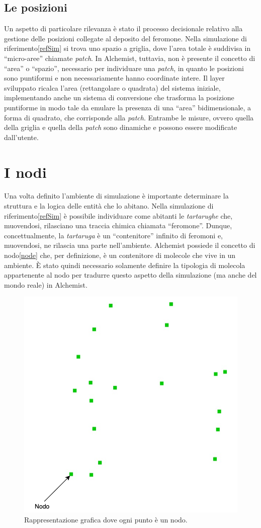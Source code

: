 \subsection{Le posizioni}
Un aspetto di particolare rilevanza è stato il processo decisionale relativo alla gestione delle posizioni collegate 
al deposito del feromone. Nella simulazione di riferimento\space\ref{refSim} si trova uno spazio a griglia, dove l'area totale è suddivisa
in ``micro-aree'' chiamate \textit{patch}. In Alchemist, tuttavia, non è presente il concetto di ``area'' o ``spazio'', necessario per individuare una \textit{patch},
in quanto le posizioni sono puntiformi e non necessariamente hanno coordinate intere. Il layer sviluppato ricalca l'area (rettangolare o quadrata) del sistema iniziale,
implementando anche un sistema di conversione che trasforma la posizione puntiforme in modo tale da emulare la presenza di una ``area'' bidimensionale, a forma di quadrato, che corrisponde alla \textit{patch}.
Entrambe le misure, ovvero quella della griglia e quella della \textit{patch} sono dinamiche e possono essere modificate dall'utente.
\section{I nodi}
Una volta definito l'ambiente di simulazione è importante determinare la struttura e la logica delle 
entità che lo abitano. Nella simulazione di riferimento\space\ref{refSim} è possibile individuare come abitanti le \textit{tartarughe}
che, muovendosi, rilasciano una traccia chimica chiamata ``feromone''. Dunque, concettualmente, la \textit{tartaruga} è un ``contenitore'' infinito di 
feromoni e, muovendosi, ne rilascia una parte nell'ambiente. Alchemist possiede il concetto di nodo\space\ref{node} che, per definizione, 
è un contenitore di molecole che vive in un ambiente. È stato quindi necessario solamente definire la tipologia di molecola
appartenente al nodo per tradurre questo aspetto della simulazione (ma anche del mondo reale) in Alchemist.

\begin{figure}[ht]
    \centering
    \includegraphics[width=.5\linewidth]{figures/nodes.png}
    \caption{Rappresentazione grafica dove ogni punto è un nodo.}\label{fig:nodes}
\end{figure}

